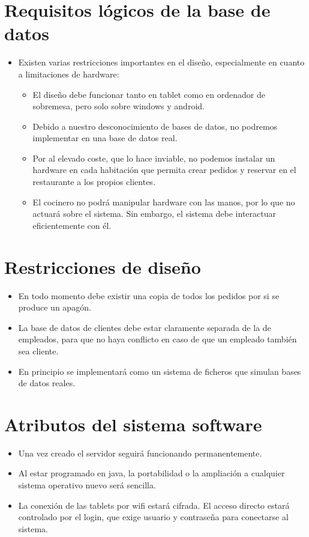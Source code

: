 \documentclass[spanish,a4paper,12pt]{report}	%
\begin{document}
\section{Requisitos lógicos de la base de datos}
\begin{itemize}
	\item Existen varias restricciones importantes en el diseño, especialmente en cuanto a limitaciones de hardware:
	\begin{itemize}
		\item El diseño debe funcionar tanto en tablet como en ordenador de sobremesa,  pero solo sobre windows y android.
		\item Debido a nuestro desconocimiento de bases de datos, no podremos implementar en una base de datos real.
		\item Por al elevado coste, que lo hace inviable, no podemos instalar un hardware en cada habitación que permita crear pedidos y reservar en el restaurante a los propios clientes.
		\item El cocinero no podrá manipular hardware con las manos, por lo que no actuará sobre el sistema. Sin embargo, el sistema debe interactuar eficientemente con él.
	\end{itemize}
\end{itemize}

\section{Restricciones de diseño}
\begin{itemize}
	\item En todo momento debe existir una copia de todos los pedidos por si se produce 	un apagón.
	\item La base de datos de clientes debe estar claramente separada de la de empleados, para que no haya conflicto en caso de que un empleado también sea cliente.
	\item En principio se implementará como un sistema de ficheros que simulan bases de datos reales.
\end{itemize}


\section{Atributos del sistema software}
\begin{itemize}
	\item Una vez creado el servidor seguirá funcionando permanentemente.
	\item Al estar programado en java, la portabilidad o la ampliación a cualquier sistema operativo  nuevo será sencilla. 
	\item La conexión de las tablets por wifi estará cifrada. El acceso directo estará controlado por el login, que exige usuario y contraseña para conectarse al sistema.
\end{itemize}


\newpage
\mbox{}
\thispagestyle{empty}						%
\newpage
\end{document}
